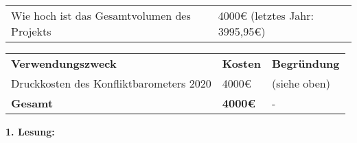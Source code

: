 {\begin{tabular}{l l}
        Wie hoch ist das Gesamtvolumen des Projekts                             &  4000€ (letztes Jahr: 3995,95€)\\
    \end{tabular}
    \newline
    \vspace*{2em}
    \newline
    \begin{tabular}{p{4cm} p{2cm} p{9cm}}
        \textbf{Verwendungszweck} & \textbf{Kosten} & \textbf{Begründung} \\
        Druckkosten des Konfliktbarometers 2020 & 4000€ & (siehe oben)\\
        \textbf{Gesamt} & \textbf{4000€} & - \\  
    \end{tabular}
}
{
    \textbf{1. Lesung:}
    \ul{
        \ul{}
    }
}

